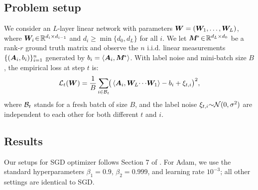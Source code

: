\subsection{Problem setup}
We consider an \(L\)-layer linear network with parameters  
\({\bm{W}} = ({\bm{W}}_{1},\dots,{\bm{W}}_{L})\), where \({\bm{W}}_{i}\!\in\!\mathbb{R}^{d_{i}\times d_{i-1}}\) and  
\(d_{i}\!\ge\!\min\{d_{0},d_{L}\}\) for all \(i\).  
We let \({\bm{M}}^{\!*}\!\in\!\mathbb{R}^{d_{L}\times d_{0}}\) be a rank-\(r\) ground truth matrix and observe the \(n\) i.i.d. linear measurements \(\{({\bm{A}}_{i},b_{i})\}_{i=1}^{n}\) generated by
\(b_{i}= \langle {\bm{A}}_{i},{\bm{M}}^{\!*}\rangle\).  
With label noise and mini-batch size \(B\), the empirical loss at step \(t\) is: 
\[
\mathcal{L}_{t}({\bm{W}})=\frac{1}{B}\sum_{i\in\mathcal{B}_{t}}
  \!\bigl(\, \langle {\bm{A}}_{i},{\bm{W}}_{L}\!\cdots\!{\bm{W}}_{1}\rangle-b_{i}
  +\xi_{t,i}\bigr)^{2},
\]
where \(\mathcal{B}_{t}\) stands for a fresh batch of size $B$, and the label noise 
\(\xi_{t,i}{\sim}\mathcal{N}(0,\sigma^{2})\) are independent to each other for both different $t$ and $i$.


\subsection{Results}
Our setups for SGD optimizer follows Section 7 of \citet{gatmiry2023inductive}.  
For Adam, we use the standard hyperparameters  
\(\beta_{1}=0.9\), \(\beta_{2}=0.999\), and learning rate \(10^{-3}\); all other settings are identical to SGD.

